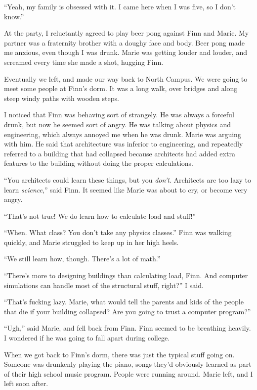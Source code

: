 ``Yeah, my family is obsessed with it.  I came here when I was five, so I don't
know.''

At the party, I reluctantly agreed to play beer pong against Finn and Marie.  My
partner was a fraternity brother with a doughy face and body.  Beer pong made me
anxious, even though I was drunk.  Marie was getting louder and louder, and
screamed every time she made a shot, hugging Finn.

Eventually we left, and made our way back to North Campus.  We were going to
meet some people at Finn's dorm.  It was a long walk, over bridges and along
steep windy paths with wooden steps.

I noticed that Finn was behaving sort of strangely.  He was always a forceful
drunk, but now he seemed sort of angry.  He was talking about physics and
engineering, which always annoyed me when he was drunk.  Marie was arguing with
him.  He said that architecture was inferior to engineering, and repeatedly
referred to a building that had collapsed because architects had added extra
features to the building without doing the proper calculations.

``You architects could learn these things, but you \textit{don't}.  Architects
are too lazy to learn \textit{science},'' said Finn.  It seemed like Marie was
about to cry, or become very angry.

``That's not true!  We do learn how to calculate load and stuff!''

``When.  What class?  You don't take any physics classes.''  Finn was walking
quickly, and Marie struggled to keep up in her high heels.

``We still learn how, though.  There's a lot of math.''

``There's more to designing buildings than calculating load, Finn.  And computer
simulations can handle most of the structural stuff, right?'' I said.

``That's fucking lazy.  Marie, what would tell the parents and kids of the
people that die if your building collapsed?  Are you going to trust a computer
program?'' 

``Ugh,'' said Marie, and fell back from Finn.  Finn seemed to be breathing
heavily.  I wondered if he was going to fall apart during college.  

When we got back to Finn's dorm, there was just the typical stuff going on.
Someone was drunkenly playing the piano, songs they'd obviously learned as part
of their high school music program.  People were running around.  Marie left,
and I left soon after.  


